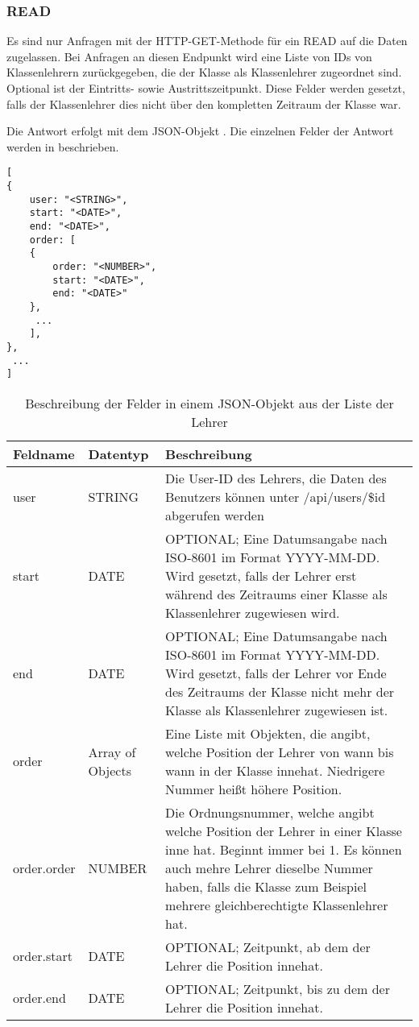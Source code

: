 \subsubsection{READ}
\label{sec:rest:api:classes:id:teachers:read}
Es sind nur Anfragen mit der HTTP-GET-Methode für ein READ auf die Daten zugelassen.
Bei Anfragen an diesen Endpunkt wird eine Liste von IDs von Klassenlehrern zurückgegeben, die der Klasse als Klassenlehrer zugeordnet sind.
Optional ist der Eintritts- sowie Austrittszeitpunkt. Diese Felder werden gesetzt, falls der Klassenlehrer dies nicht über den kompletten Zeitraum der Klasse war.

Die Antwort erfolgt mit dem JSON-Objekt . 
Die einzelnen Felder der Antwort werden in  beschrieben.

\begin{lstlisting}[caption={JSON-Antwort für einen GET-Aufruf des Pfads /api/classes/\$id/teachers},label={lst:code:rest:api:classes:id:teachers:read:ret},frame=tlrb]
[ 
{ 
	user: "<STRING>",
  	start: "<DATE>",
  	end: "<DATE>",
	order: [
	{
		order: "<NUMBER>",
    	start: "<DATE>",
    	end: "<DATE>"
	},
	 ...
	],
},
 ... 
]
\end{lstlisting}

\begin{longtable}{|p{}|p{}|p{}|}
		\caption{Beschreibung der Felder in einem JSON-Objekt aus der Liste der Lehrer}
\endfoot
		\caption{Beschreibung der Felder in einem JSON-Objekt aus der Liste der Lehrer}
		\label{tab:rest:api:classes:id:teachers:read:ret}
\endlastfoot 
\hline
			\textbf{Feldname} & \textbf{Datentyp} & \textbf{Beschreibung} \\ \hline
\endhead
user & STRING & Die User-ID des Lehrers, die Daten des Benutzers können unter /api/users/\$id abgerufen werden  \\ \hline
start & DATE & OPTIONAL; Eine Datumsangabe nach ISO-8601 im Format YYYY-MM-DD. Wird gesetzt, falls der Lehrer erst während des Zeitraums einer Klasse als Klassenlehrer zugewiesen wird. \\ \hline
end & DATE & OPTIONAL; Eine Datumsangabe nach ISO-8601 im Format YYYY-MM-DD. Wird gesetzt, falls der Lehrer vor Ende des Zeitraums der Klasse nicht mehr der Klasse als Klassenlehrer zugewiesen ist. \\ \hline
order & Array of Objects & Eine Liste mit Objekten, die angibt, welche Position der Lehrer von wann bis wann in der Klasse innehat. Niedrigere Nummer heißt höhere Position. \\ \hline
order.order & NUMBER & Die Ordnungsnummer, welche angibt welche Position der Lehrer in einer Klasse inne hat. Beginnt immer bei 1. Es können auch mehre Lehrer dieselbe Nummer haben, falls die Klasse zum Beispiel mehrere gleichberechtigte Klassenlehrer hat. \\ \hline
order.start & DATE & OPTIONAL; Zeitpunkt, ab dem der Lehrer die Position innehat. \\ \hline
order.end & DATE & OPTIONAL; Zeitpunkt, bis zu dem der Lehrer die Position innehat. \\ \hline
\end{longtable}
